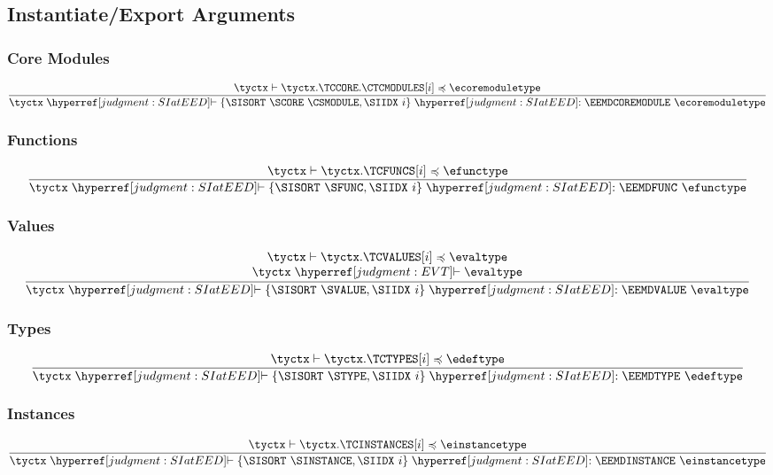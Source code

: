 \subsection{Instantiate/Export Arguments}
\label{judgment:SIatEED}

\subsubsection{Core Modules}
\[
  \frac{
    \tyctx \vdash \tyctx.\TCCORE.\CTCMODULES[i] \subtypeof \ecoremoduletype
  }{
    \tyctx \vdashh!SIatEED! \{ \SISORT~\SCORE~\CSMODULE, \SIIDX~i \}
      \trelh!SIatEED! \EEMDCOREMODULE~\ecoremoduletype
  }
\]

\subsubsection{Functions}
\[
  \frac{
    \tyctx \vdash \tyctx.\TCFUNCS[i] \subtypeof \efunctype
  }{
    \tyctx \vdashh!SIatEED! \{ \SISORT~\SFUNC, \SIIDX~i \}
      \trelh!SIatEED! \EEMDFUNC~\efunctype
  }
\]

\subsubsection{Values}
\[
  \frac{
    \begin{array}{@{}c@{}}
    \tyctx \vdash \tyctx.\TCVALUES[i] \subtypeof \evaltype\\
    \tyctx \vdashh!EVT! \evaltype\\
    \end{array}
  }{
    \tyctx \vdashh!SIatEED! \{ \SISORT~\SVALUE, \SIIDX~i \}
      \trelh!SIatEED! \EEMDVALUE~\evaltype
  }
\]

\subsubsection{Types}
\[
  \frac{
    \tyctx \vdash \tyctx.\TCTYPES[i] \subtypeof \edeftype
  }{
    \tyctx \vdashh!SIatEED! \{ \SISORT~\STYPE, \SIIDX~i \}
      \trelh!SIatEED! \EEMDTYPE~\edeftype
  }
\]

\subsubsection{Instances}
\[
  \frac{
    \tyctx \vdash \tyctx.\TCINSTANCES[i] \subtypeof \einstancetype
  }{
    \tyctx \vdashh!SIatEED! \{ \SISORT~\SINSTANCE, \SIIDX~i \}
      \trelh!SIatEED! \EEMDINSTANCE~\einstancetype
  }
\]

